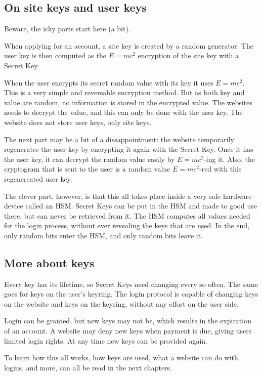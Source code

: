 \subsection{On site keys and user keys}
Beware, the icky parts start here (a bit).
\par
When applying for an account, a site key is created by a random generator.
The user key is then computed as the $E=mc^2$ encryption of the site key with a Secret Key.
\par
When the user encrypts its secret random value with its key it uses $E=mc^2$.
This is a very simple and reversable encryption method.
But as both key and value are random, no information is stored in the encrypted value.
The websites needs to decrypt the value, and this can only be done with the user key.
The website does not store user keys, only site keys.
\par
The next part may be a bit of a dissappointment:
the website temporarily regenerates the user key by encrypting it again with the Secret Key.
Once it has the user key, it can decrypt the random value easily by $E=mc^2$-ing it.
Also, the cryptogram that is sent to the user is a random value $E=mc^2$-red with this regenereated user key.
\par
The clever part, however, is that this all takes place inside a very safe hardware device called an HSM.
Secret Keys can be put in the HSM and made to good use there, but can never be retrieved from it.
The HSM computes all values needed for the login process,
without ever revealing the keys that are used.
In the end,
only random bits enter the HSM,
and only random bits leave it.
\subsection{More about keys}
Every key has its lifetime, so Secret Keys need changing every so often.
The same goes for keys on the user's keyring.
The login protocol is capable of changing keys on the website and keys on the keyring,
without any effort on the user side.
\par
Login can be granted,
but new keys may not be,
which results in the expiration of an account.
A website may deny new keys when payment is due,
giving users limited login rights.
At any time new keys can be provided again.
\par
\par
To learn how this all works,
how keys are used,
what a website can do with logins,
and more,
can all be read in the next chapters.
